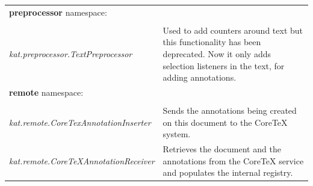 \documentclass[a4paper, 12pt, notitlepage]{report}
\begin{document}
\begin{tabular}{p{6cm} | p{8cm} }
 \textbf{preprocessor} namespace: \\\\ \hline
 \textit{kat.preprocessor.TextPreprocessor} & Used to add counters around text but this functionality has been deprecated. Now it only adds selection listeners in the text, for adding annotations.\\ \hline
 \textbf{remote} namespace: \\\\ \hline
 \textit{kat.remote.CoreTexAnnotationInserter} & Sends the annotations being created on this document to the CoreTeX system.\\ \hline
 \textit{kat.remote.CoreTeXAnnotationReceiver} & Retrieves the document and the annotations from the CoreTeX service and populates the internal registry. \\ \hline
 
\end{tabular}
\end{document}
